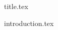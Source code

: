 \documentclass[a4paper,12pt]{article}
\begin{document}
{title.tex}




\newpage
\vfill
\tableofcontents
\vfill
\newpage
\listoffigures

\newpage
{}



{introduction.tex}
\end{document}
